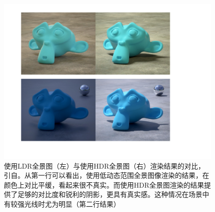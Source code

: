 \begin{figure}[!htbp]
    \centering
    \includegraphics[width=1.0\textwidth]{Img/hdr-render.pdf}
    \caption[使用HDR全景图与LDR全景图渲染结果的对比]
    {使用LDR全景图（左）与使用HDR全景图（右）渲染结果的对比，引自\cite{makehdr}。从第一行可以看出，使用低动态范围全景图像渲染的结果，在颜色上对比平缓，看起来很不真实。而使用HDR全景图渲染的结果提供了足够的对比度和锐利的阴影，更具有真实感。这种情况在场景中有较强光线时尤为明显（第二行结果）}
    \label{fig:hdr-render}
\end{figure}